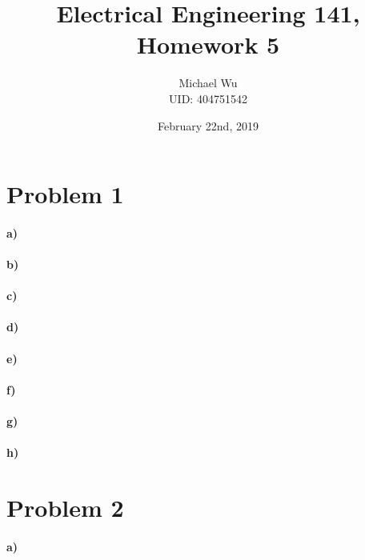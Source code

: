 \documentclass[12pt]{article}
\begin{document}
\title{Electrical Engineering 141, Homework 5}
\date{February 22nd, 2019}
\author{Michael Wu\\UID: 404751542}
\maketitle

\section*{Problem 1}

\paragraph{a)}

\paragraph{b)}

\paragraph{c)}

\paragraph{d)}

\paragraph{e)}

\paragraph{f)}

\paragraph{g)}

\paragraph{h)}

\section*{Problem 2}

\paragraph{a)}
\end{document}
